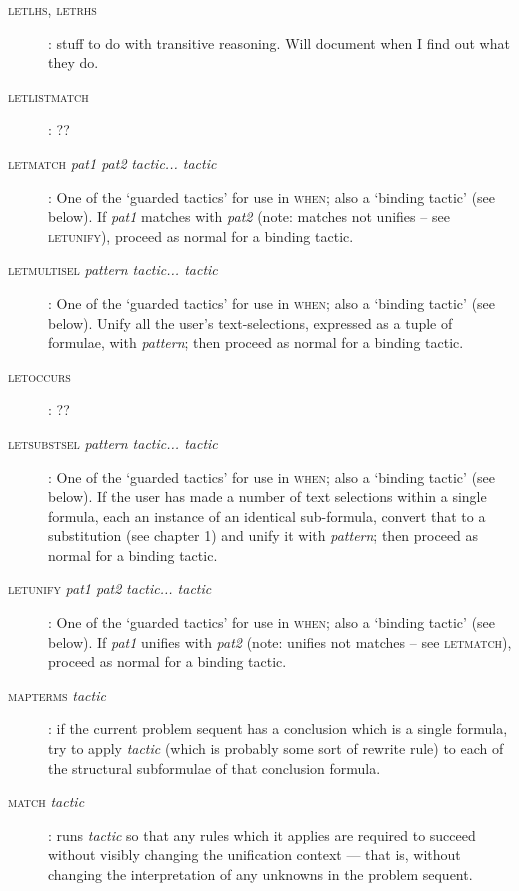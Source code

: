 \begin{description}
\item[\textsc{letlhs, letrhs}]: stuff to do with transitive reasoning. Will document when I find out what they do.

\item[\textsc{letlistmatch}]: ??

\item [\textsc{letmatch} \textit{pat1 pat2} \textit{tactic... tactic}]: One of the `guarded tactics' for use in \textsc{when}; also a `binding tactic' (see below). If \textit{pat1} matches with \textit{pat2} (note: matches not unifies -- see \textsc{letunify}), proceed as normal for a binding tactic.


\item [\textsc{letmultisel} \textit{pattern tactic... tactic}]: One of the `guarded tactics' for use in \textsc{when}; also a `binding tactic' (see below). Unify all the user's text-selections, expressed as a tuple of formulae, with \textit{pattern}; then proceed as normal for a binding tactic.

\item [\textsc{letoccurs}]: ??

\item [\textsc{letsubstsel} \textit{pattern tactic... tactic}]: One of the `guarded tactics' for use in \textsc{when}; also a `binding tactic' (see below). If the user has made a number of text selections within a single formula, each an instance of an identical sub-formula, convert that to a substitution (see chapter 1) and unify it with \textit{pattern}; then proceed as normal for a binding tactic.

\item [\textsc{letunify} \textit{pat1 pat2} \textit{tactic... tactic}]: One of the `guarded tactics' for use in \textsc{when}; also a `binding tactic' (see below). If \textit{pat1} unifies with \textit{pat2} (note: unifies not matches -- see \textsc{letmatch}), proceed as normal for a binding tactic.



\item [\textsc{mapterms} \textit{tactic}]: if the current problem sequent has a conclusion which is a single formula, try to apply \textit{tactic} (which is probably some sort of rewrite rule) to each of the structural subformulae of that conclusion formula.

\item [\textsc{match} \textit{tactic}]: runs \textit{tactic} so that any rules which it applies are required to succeed without visibly changing the unification context --- that is, without changing the interpretation of any unknowns in the problem sequent.


\end{description}
